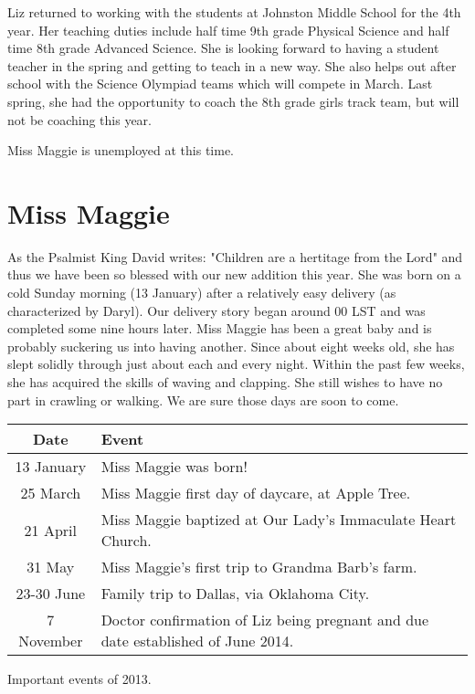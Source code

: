 \documentclass{article}
\makeatletter
\newenvironment{tablehere}
  {\def\@captype{table}}
  {}
\makeatother
\begin{document}
\begin{multicols}{2}
Liz returned to working with the students at Johnston Middle School for the
4th year.  Her teaching duties include half time 9th grade Physical Science
and half time 8th grade Advanced Science.  She is looking forward to having
a student teacher in the spring and getting to teach in a new way.  She
also helps out after school with the Science Olympiad teams which will
compete in March.  Last spring, she had the opportunity to coach the 8th
grade girls track team, but will not be coaching this year.

Miss Maggie is unemployed at this time. 

\section{Miss Maggie}

As the Psalmist King David writes: "Children are a hertitage from the Lord"
and thus we have been so blessed with our new addition this year.  She was born on
a cold Sunday morning (13 January) after a relatively easy delivery (as 
characterized by Daryl).  Our delivery story began around 00 LST and was 
completed some nine hours later.  Miss Maggie has been a great baby and 
is probably suckering us into having another. Since about eight weeks old,
she has slept solidly through just about each and every night.  Within the
past few weeks, she has acquired the skills of waving and clapping.  She
still wishes to have no part in crawling or walking.  We are sure those days
are soon to come.

\begin{tablehere}
 \begin{center}
  \begin{tabular}{|c|p{5cm}|}
   \multicolumn{1}{c}{Date} &
   \multicolumn{1}{l}{Event} \\ \hline \hline
   13 January     & Miss Maggie was born! \\
   25 March       & Miss Maggie first day of daycare, at Apple Tree. \\
   21 April       & Miss Maggie baptized at Our Lady's Immaculate Heart Church. \\
   31 May         & Miss Maggie's first trip to Grandma Barb's farm. \\
   23-30 June     & Family trip to Dallas, via Oklahoma City. \\
   7 November     & Doctor confirmation of Liz being pregnant and due date established of June 2014. \\
\hline 
  \end{tabular}
 \end{center}
 \caption{Important events of 2013.}
 \label{table:timeline}
\end{tablehere}


\end{multicols}
\end{document}
